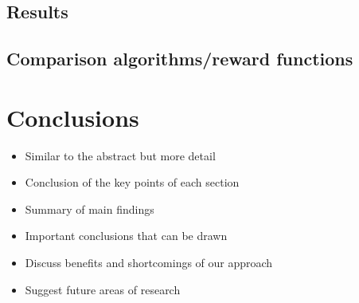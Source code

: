 \documentclass[letterpaper, 10 pt, conference]{ieeeconf}  %
\begin{document}
\subsection{Results}
\subsection{Comparison algorithms/reward functions}

\section{Conclusions}

\begin{itemize}
      \item Similar to the abstract but more detail
      \item Conclusion of the key points of each section
      \item Summary of main findings
      \item Important conclusions that can be drawn
      \item Discuss benefits and shortcomings of our approach
      \item Suggest future areas of research
   \end{itemize}


\addtolength{\textheight}{-12cm}   %


















\newpage





\newpage

\appendices
\end{document}
